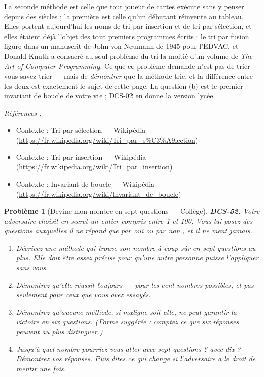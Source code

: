 \documentclass[11pt]{article}
\newtheorem{problem}{Problème}
\newenvironment{refs}{\par\small\noindent\emph{Références :}\begin{itemize}\setlength\itemsep{0pt}}{\end{itemize}\normalsize}
\begin{document}
\noindent La seconde méthode est celle que tout joueur de cartes exécute sans y
penser depuis des siècles ; la première est celle qu'un débutant réinvente au tableau. Elles
portent aujourd'hui les noms de tri par insertion et de tri par sélection, et elles étaient
déjà l'objet des tout premiers programmes écrits : le tri par fusion figure dans un
manuscrit de John von Neumann de 1945 pour l'EDVAC, et Donald Knuth a consacré au seul
problème du tri la moitié d'un volume de \textit{The Art of Computer Programming}. Ce que ce
problème demande n'est pas de trier --- vous savez trier --- mais de \textit{démontrer} que la
méthode trie, et la différence entre les deux est exactement le sujet de cette page. La
question (b) est le premier invariant de boucle de votre vie ; DCS-02 en donne la version
lycée.

\begin{refs}
\item Contexte : Tri par sélection --- Wikipédia (\url{https://fr.wikipedia.org/wiki/Tri_par_s%C3%A9lection})
\item Contexte : Tri par insertion --- Wikipédia (\url{https://fr.wikipedia.org/wiki/Tri_par_insertion})
\item Contexte : Invariant de boucle --- Wikipédia (\url{https://fr.wikipedia.org/wiki/Invariant_de_boucle})
\end{refs}

\bigskip

\begin{problem}[{Devine mon nombre en sept questions --- Collège}]
\textbf{DCS-52.} Votre adversaire choisit en secret un entier compris entre 1 et 100. Vous
lui posez des questions auxquelles il ne répond que par \og{} oui \fg{} ou par \og{} non \fg{}, et il ne ment
jamais.
\begin{enumerate}
\item[(a)] Décrivez une méthode qui trouve son nombre à coup sûr en sept questions au plus. Elle
doit être assez précise pour qu'une autre personne puisse l'appliquer sans vous.
\item[(b)] Démontrez qu'elle réussit toujours --- pour les cent nombres possibles, et pas seulement
pour ceux que vous avez essayés.
\item[(c)] Démontrez qu'aucune méthode, si maligne soit-elle, ne peut garantir la victoire en six
questions. (Forme suggérée : comptez ce que six réponses peuvent au plus distinguer.)
\item[(d)] Jusqu'à quel nombre pourriez-vous aller avec sept questions ? avec dix ? Démontrez vos
réponses. Puis dites ce qui change si l'adversaire a le droit de mentir une fois.
\end{enumerate}

\end{problem}
\end{document}
